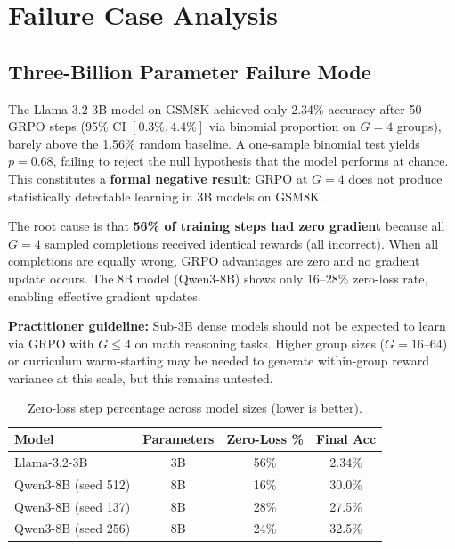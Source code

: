 \documentclass{article}
\begin{document}
\section{Failure Case Analysis}

\subsection{Three-Billion Parameter Failure Mode}

The Llama-3.2-3B model on GSM8K achieved only 2.34\% accuracy after 50 GRPO steps (95\% CI $[0.3\%, 4.4\%]$ via binomial proportion on $G{=}4$ groups), barely above the 1.56\% random baseline. A one-sample binomial test yields $p{=}0.68$, failing to reject the null hypothesis that the model performs at chance. This constitutes a \textbf{formal negative result}: GRPO at $G{=}4$ does not produce statistically detectable learning in 3B models on GSM8K.

The root cause is that \textbf{56\% of training steps had zero gradient} because all $G{=}4$ sampled completions received identical rewards (all incorrect). When all completions are equally wrong, GRPO advantages are zero and no gradient update occurs. The 8B model (Qwen3-8B) shows only 16--28\% zero-loss rate, enabling effective gradient updates.

\textbf{Practitioner guideline:} Sub-3B dense models should not be expected to learn via GRPO with $G \leq 4$ on math reasoning tasks. Higher group sizes ($G{=}16$--$64$) or curriculum warm-starting may be needed to generate within-group reward variance at this scale, but this remains untested.

\begin{table}[htbp]
    \centering
    \caption{Zero-loss step percentage across model sizes (lower is better).}
    \begin{tabular}{lccc}
        \toprule
        Model & Parameters & Zero-Loss \% & Final Acc \\
        \midrule
        Llama-3.2-3B & 3B & 56\% & 2.34\% \\
        Qwen3-8B (seed 512) & 8B & 16\% & 30.0\% \\
        Qwen3-8B (seed 137) & 8B & 28\% & 27.5\% \\
        Qwen3-8B (seed 256) & 8B & 24\% & 32.5\% \\
        \bottomrule
    \end{tabular}
    \label{tab:zero_loss}
\end{table}
\end{document}
